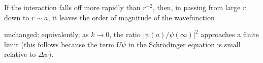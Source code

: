 If the interaction falls off more rapidly than $r^{-2}$, then, in passing from large $r$ down to $r\sim a$, it leaves the order of magnitude of the wavefunction

unchanged; equivalently, as $k\to0$, the ratio $|\psi(a)/\psi(\infty)|^2$ approaches a finite limit (this follows because the term $U\psi$ in the Schrödinger equation is small relative to $\Delta\psi$).
